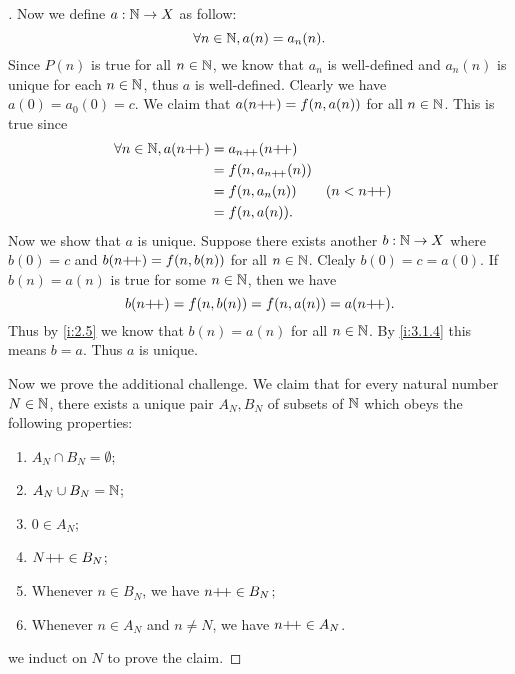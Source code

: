 \begin{proof}[]
  Now we define \(a : \mathbb{N} \to X\) as follow:
  \[
    \forall n \in \mathbb{N}, a(n) = a_n(n).
  \]
  Since \(P(n)\) is true for all \(n \in \mathbb{N}\), we know that \(a_n\) is well-defined and \(a_n(n)\) is unique for each \(n \in \mathbb{N}\), thus \(a\) is well-defined.
  Clearly we have \(a(0) = a_0(0) = c\).
  We claim that \(a(n{+}\!{+}) = f(n, a(n))\) for all \(n \in \mathbb{N}\).
  This is true since
  \begin{align*}
    \forall n \in \mathbb{N}, a(n{+}\!{+}) & = a_{n{+}\!{+}}(n{+}\!{+})                    \\
                              & = f(n, a_{n{+}\!{+}}(n))                 \\
                              & = f(n, a_n(n))      &  & (n < n{+}\!{+}) \\
                              & = f(n, a(n)).
  \end{align*}
  Now we show that \(a\) is unique.
  Suppose there exists another \(b : \mathbb{N} \to X\) where \(b(0) = c\) and \(b(n{+}\!{+}) = f(n, b(n))\) for all \(n \in \mathbb{N}\).
  Clealy \(b(0) = c = a(0)\).
  If \(b(n) = a(n)\) is true for some \(n \in \mathbb{N}\), then we have
  \[
    b(n{+}\!{+}) = f(n, b(n)) = f(n, a(n)) = a(n{+}\!{+}).
  \]
  Thus by \cref{i:2.5} we know that \(b(n) = a(n)\) for all \(n \in \mathbb{N}\).
  By \cref{i:3.1.4} this means \(b = a\).
  Thus \(a\) is unique.

  Now we prove the additional challenge.
  We claim that for every natural number \(N \in \mathbb{N}\), there exists a unique pair \(A_N, B_N\) of subsets of \(\mathbb{N}\) which obeys the following properties:
  \begin{enumerate}
    \item \(A_N \cap B_N = \emptyset\);
    \item \(A_N \cup B_N = \mathbb{N}\);
    \item \(0 \in A_N\);
    \item \(N{+}\!{+} \in B_N\);
    \item Whenever \(n \in B_N\), we have \(n{+}\!{+} \in B_N\);
    \item Whenever \(n \in A_N\) and \(n \neq N\), we have \(n{+}\!{+} \in A_N\).
  \end{enumerate}
  we induct on \(N\) to prove the claim.


\end{proof}
